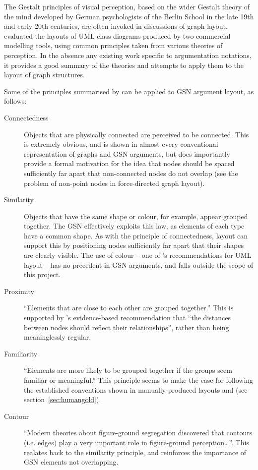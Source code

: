 The Gestalt principles of visual perception,
based on the wider Gestalt theory of the mind developed by German psychologists of the Berlin School in the late 19th and early 20th centuries,
are often \citep[pp.~136]{storrle} invoked in discussions of graph layout.
\citet{kennysun} evaluated the layouts of UML class diagrams produced by two commercial modelling tools, using common principles taken from various theories of perception.
In the absence any existing work specific to argumentation notations, it provides a good summary of the theories and attempts to apply them to the layout of graph structures.

Some of the principles summarised by \citet{kennysun} can be applied to GSN argument layout, as follows:

\begin{description}
    \item[Connectedness] Objects that are physically connected are perceived to be connected. This is extremely obvious, and is shown in almost every conventional representation of graphs and GSN arguments, but does importantly provide a formal motivation for the idea that nodes should be spaced sufficiently far apart that non-connected nodes do not overlap (see the problem of non-point nodes in force-directed graph layout). 

    \item[Similarity] Objects that have the same shape or colour, for example, appear grouped together.
    The GSN effectively exploits this law, as elements of each type have a common shape. As with the principle of connectedness, layout can support this by positioning nodes sufficiently far apart that their shapes are clearly visible.
    The use of colour -- one of \citet{kennysun}'s recommendations for UML layout -- has no precedent in GSN arguments, and falls outside the scope of this project.
    
    \item[Proximity] ``Elements that are close to each other are grouped together.'' This is supported by \citet{huang2007effects}'s evidence-based recommendation that ``the distances between nodes should reflect their relationships'', rather than being meaninglessly regular.
    
    \item[Familiarity] ``Elements are more likely to be grouped together if the groups seem familiar or meaningful.'' This principle seems to make the case for following the established conventions shown in manually-produced layouts and \cite{gsnstandard} (see section~\ref{sec:humangold}).

    \item[Contour] ``Modern theories about figure-ground segregation
discovered that contours (i.e. edges) play a very
important role in figure-ground perception\ldots''. This realates back to the similarity principle, and reinforces the importance of GSN elements not overlapping.

\end{description}



